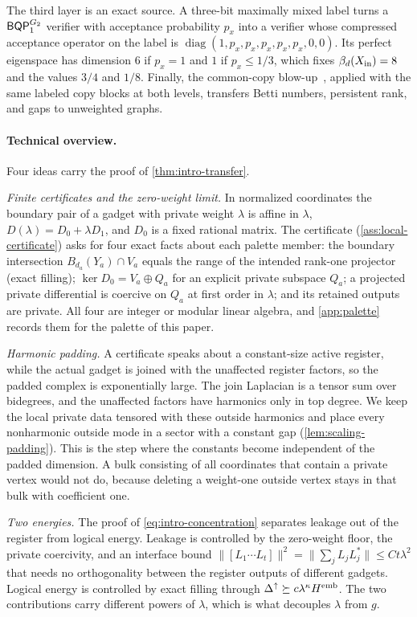 The third layer is an exact source. A three-bit maximally mixed label turns a \(\mathsf{BQP}_{1}^{G_2}\) verifier with acceptance probability \(p_x\) into a verifier whose compressed acceptance operator on the label is \(\operatorname{diag}(1,p_x,p_x,p_x,p_x,p_x,0,0)\). Its perfect eigenspace has dimension \(6\) if \(p_x=1\) and \(1\) if \(p_x\le1/3\), which fixes \(\beta_d(X_{\mathrm{in}})=8\) and the values \(3/4\) and \(1/8\). Finally, the common-copy blow-up~\cite{hayakawa2026unweighted}, applied with the same labeled copy blocks at both levels, transfers Betti numbers, persistent rank, and gaps to unweighted graphs.

\paragraph{Technical overview.}
Four ideas carry the proof of \cref{thm:intro-transfer}.

\emph{Finite certificates and the zero-weight limit.} In normalized coordinates the boundary pair of a gadget with private weight \(\lambda\) is affine in \(\lambda\), \(D(\lambda)=D_0+\lambda D_1\), and \(D_0\) is a fixed rational matrix. The certificate (\cref{ass:local-certificate}) asks for four exact facts about each palette member: the boundary intersection \(B_{d_a}(Y_a)\cap V_a\) equals the range of the intended rank-one projector (exact filling); \(\ker D_0=V_a\oplus Q_a\) for an explicit private subspace \(Q_a\); a projected private differential is coercive on \(Q_a\) at first order in \(\lambda\); and its retained outputs are private. All four are integer or modular linear algebra, and \cref{app:palette} records them for the palette of this paper.

\emph{Harmonic padding.} A certificate speaks about a constant-size active register, while the actual gadget is joined with the unaffected register factors, so the padded complex is exponentially large. The join Laplacian is a tensor sum over bidegrees, and the unaffected factors have harmonics only in top degree. We keep the local private data tensored with these outside harmonics and place every nonharmonic outside mode in a sector with a constant gap (\cref{lem:scaling-padding}). This is the step where the constants become independent of the padded dimension. A bulk consisting of all coordinates that contain a private vertex would not do, because deleting a weight-one outside vertex stays in that bulk with coefficient one.

\emph{Two energies.} The proof of \cref{eq:intro-concentration} separates leakage out of the register from logical energy. Leakage is controlled by the zero-weight floor, the private coercivity, and an interface bound \(\|[L_1\cdots L_t]\|^2=\|\sum_jL_jL_j^*\|\le Ct\lambda^2\) that needs no orthogonality between the register outputs of different gadgets. Logical energy is controlled by exact filling through \(\Delta^\uparrow\succeq c\lambda^\kappa H^{\rm emb}\). The two contributions carry different powers of \(\lambda\), which is what decouples \(\lambda\) from \(g\).

